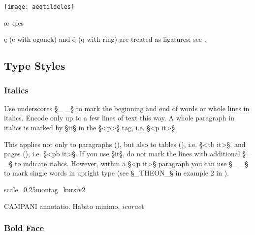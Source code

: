 \begin{example}

\texttt{[image: aeqtildeles]}

\vspace{-3mm}
\begin{typeLatin}
æ\bs~qles
\end{typeLatin}

\end{example}

\begin{note}
\k{e} (e with ogonek) and \r{q} (q with ring) are treated as ligatures; see .
\end{note}


\tocspace
\subsection{Type Styles}

\subsubsection{Italics}
\label{section italics}

\begin{mainrule}
Use underscores §_ _§ to mark the beginning and end of words or whole lines in italics. Encode only up to a few lines of text this way. A whole paragraph in italics is marked by §it§ in the §<p>§ tag, i.e. §<p it>§.
\end{mainrule}

\begin{clarification}
This applies not only to paragraphs (), but also to tables (), i.e. §<tb it>§, and pages (), i.e. §<pb it>§. If you use §it§, do not mark the lines with additional §_ _§ to indicate italics. However, within a §<p it>§ paragraph you can use §_ _§ to mark single words in upright type (see §_THEON_§ in example 2 in ).
\end{clarification}

\begin{sampleImageSmall}{scale=0.25}{montag_kursiv2}
\begin{typeLatin}
CAMPANI \bold{_}annotatio\bold{_}. Habito minimo, $i cura e$t
\end{typeLatin}
\end{sampleImageSmall}


\subsubsection{Bold Face}
\label{section bold face}

